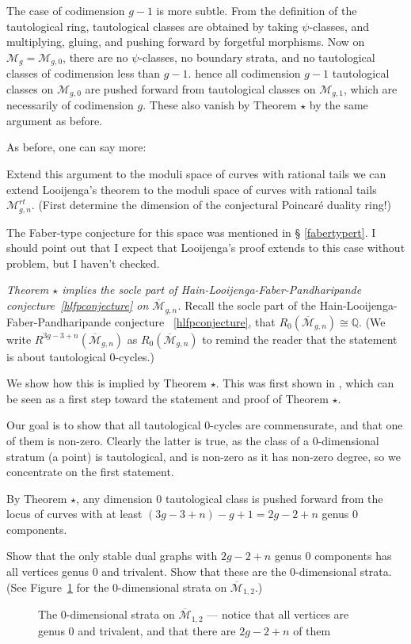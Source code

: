 \documentclass[12pt,letterpaper]{amsart}
\newcommand{\epoint}[1]{\vspace{3mm}\par \noindent \refstepcounter{subsection}{\bf \thesubsection.} 
  {\em #1.} }
\newcommand{\Q}{\mathbb{Q}}
\newcommand{\cm}{{\mathcal{M}}}
\newcommand{\cmbar}{\overline{\cm}}
\newcommand{\lremind}[1]{{\bf[label:  #1]}}
\renewcommand{\lremind}[1]{{}}
\begin{document}
{The case of codimension $g-1$ is more subtle.  
From the definition of the tautological ring,
tautological classes are obtained by taking $\psi$-classes,
and multiplying, gluing, and pushing forward by forgetful morphisms.
Now on $\cm_g = \cm_{g,0}$, there are no $\psi$-classes, no boundary 
strata, and no tautological classes of codimension less than $g-1$.
hence all codimension $g-1$ tautological classes on $\cm_{g,0}$ are pushed
forward from tautological classes on $\cm_{g,1}$, which are necessarily of
codimension $g$.  These also vanish by Theorem $\star$ by the same argument as before.

As before, one can say more: 

  Extend this argument to the moduli space of
curves with rational tails we can extend Looijenga's theorem to the
moduli space of curves with rational tails $\cm_{g,n}^{rt}$.  (First
determine the dimension of the conjectural Poincar\'e duality ring!)

The Faber-type conjecture for this space was mentioned in \S
\ref{fabertypert}.  I should point out that I expect that Looijenga's
proof extends to this case without problem, but I haven't checked.

\epoint{Theorem $\star$ implies the socle part of
  Hain-Looijenga-Faber-Pandharipande conjecture~\ref{hlfpconjecture}
  on $\cmbar_{g,n}$} Recall the socle part of the Hain-Looijenga-Faber-Pandharipande
conjecture ~\ref{hlfpconjecture}, that $R_0(\cmbar_{g,n}) \cong
\Q$.\label{soclepf}\lremind{soclepf} (We write
$R^{3g-3+n}(\cmbar_{g,n})$ as $R_0(\cmbar_{g,n})$ to remind the reader
that the statement is about tautological $0$-cycles.)

We show how this is implied by Theorem $\star$.  
This was first shown in 
\cite{socle}, which can be seen as a first step toward the
statement and proof of Theorem $\star$.


Our goal is to show
that all tautological $0$-cycles are commensurate, and that one of
them is non-zero.  Clearly the latter is true, as the class of a
$0$-dimensional stratum (a point) is tautological, and is non-zero as
it has non-zero degree, so we concentrate on the first statement.

By Theorem $\star$, any dimension $0$
tautological class is pushed forward from the locus  of curves
with at least $(3g-3+n)-g+1=2g-2+n$ genus $0$ components.

Show that  the only stable dual graphs with $2g-2+n$ genus $0$
components has all vertices genus $0$ and trivalent. 
Show that these are the $0$-dimensional strata. (See Figure~\ref{m12}
for the $0$-dimensional strata on $\cmbar_{1,2}$.)
\begin{figure}
\begin{center}

\end{center}
\caption{The $0$-dimensional strata on $\cmbar_{1,2}$ --- notice
that all vertices are genus $0$ and trivalent, and that there are $2g-2+n$
of them\lremind{m12}}\label{m12}
\end{figure}


}
\end{document}
